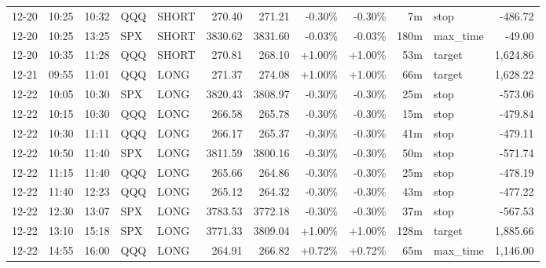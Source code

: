 \documentclass[11pt,a4paper,twoside]{article}
\begin{document}
\begin{center}
\begin{longtable}{>{\color{txtmain}}l l l l l r r r r r >{\color{txtmain}}l r}
12-20 & 10:25 & 10:32 & QQQ & SHORT & 270.40 & 271.21 & \textcolor{lossred}{-0.30\%} & \textcolor{lossred}{-0.30\%} & 7m & stop & \textcolor{lossred}{-486.72} \\
12-20 & 10:25 & 13:25 & SPX & SHORT & 3830.62 & 3831.60 & \textcolor{lossred}{-0.03\%} & \textcolor{lossred}{-0.03\%} & 180m & max\_time & \textcolor{lossred}{-49.00} \\
12-20 & 10:35 & 11:28 & QQQ & SHORT & 270.81 & 268.10 & \textcolor{wingreen}{+1.00\%} & \textcolor{wingreen}{+1.00\%} & 53m & target & \textcolor{wingreen}{1,624.86} \\
12-21 & 09:55 & 11:01 & QQQ & LONG & 271.37 & 274.08 & \textcolor{wingreen}{+1.00\%} & \textcolor{wingreen}{+1.00\%} & 66m & target & \textcolor{wingreen}{1,628.22} \\
12-22 & 10:05 & 10:30 & SPX & LONG & 3820.43 & 3808.97 & \textcolor{lossred}{-0.30\%} & \textcolor{lossred}{-0.30\%} & 25m & stop & \textcolor{lossred}{-573.06} \\
12-22 & 10:15 & 10:30 & QQQ & LONG & 266.58 & 265.78 & \textcolor{lossred}{-0.30\%} & \textcolor{lossred}{-0.30\%} & 15m & stop & \textcolor{lossred}{-479.84} \\
12-22 & 10:30 & 11:11 & QQQ & LONG & 266.17 & 265.37 & \textcolor{lossred}{-0.30\%} & \textcolor{lossred}{-0.30\%} & 41m & stop & \textcolor{lossred}{-479.11} \\
12-22 & 10:50 & 11:40 & SPX & LONG & 3811.59 & 3800.16 & \textcolor{lossred}{-0.30\%} & \textcolor{lossred}{-0.30\%} & 50m & stop & \textcolor{lossred}{-571.74} \\
12-22 & 11:15 & 11:40 & QQQ & LONG & 265.66 & 264.86 & \textcolor{lossred}{-0.30\%} & \textcolor{lossred}{-0.30\%} & 25m & stop & \textcolor{lossred}{-478.19} \\
12-22 & 11:40 & 12:23 & QQQ & LONG & 265.12 & 264.32 & \textcolor{lossred}{-0.30\%} & \textcolor{lossred}{-0.30\%} & 43m & stop & \textcolor{lossred}{-477.22} \\
12-22 & 12:30 & 13:07 & SPX & LONG & 3783.53 & 3772.18 & \textcolor{lossred}{-0.30\%} & \textcolor{lossred}{-0.30\%} & 37m & stop & \textcolor{lossred}{-567.53} \\
12-22 & 13:10 & 15:18 & SPX & LONG & 3771.33 & 3809.04 & \textcolor{wingreen}{+1.00\%} & \textcolor{wingreen}{+1.00\%} & 128m & target & \textcolor{wingreen}{1,885.66} \\
12-22 & 14:55 & 16:00 & QQQ & LONG & 264.91 & 266.82 & \textcolor{wingreen}{+0.72\%} & \textcolor{wingreen}{+0.72\%} & 65m & max\_time & \textcolor{wingreen}{1,146.00} \\

\end{longtable}
\end{center}
\end{document}
